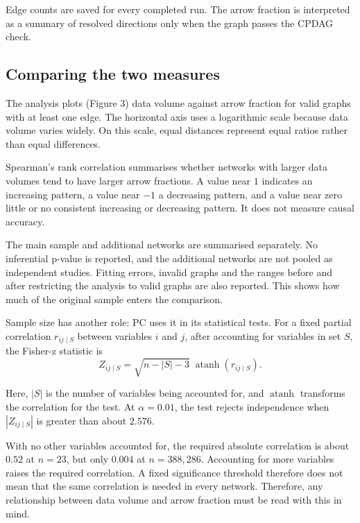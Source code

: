 \documentclass[11pt,a4paper]{article}
\begin{document}
Edge counts are saved for every completed run. The arrow fraction is interpreted as a summary of resolved directions only when the graph passes the CPDAG check.

\subsection{Comparing the two measures}
The analysis plots (Figure 3) data volume against arrow fraction for valid graphs with at least one edge. The horizontal axis uses a logarithmic scale because data volume varies widely. On this scale, equal distances represent equal ratios rather than equal differences.

Spearman's rank correlation summarises whether networks with larger data volumes tend to have larger arrow fractions. A value near $1$ indicates an increasing pattern, a value near $-1$ a decreasing pattern, and a value near zero little or no consistent increasing or decreasing pattern. It does not measure causal accuracy.

The main sample and additional networks are summarised separately. No inferential p-value is reported, and the additional networks are not pooled as independent studies. Fitting errors, invalid graphs and the ranges before and after restricting the analysis to valid graphs are also reported. This shows how much of the original sample enters the comparison.

Sample size has another role: PC uses it in its statistical tests. For a fixed partial correlation $r_{ij\mid S}$ between variables $i$ and $j$, after accounting for variables in set $S$, the Fisher-z statistic is
\begin{equation}
Z_{ij\mid S}=\sqrt{n-|S|-3}\;\operatorname{atanh}(r_{ij\mid S}).
\end{equation}

Here, $|S|$ is the number of variables being accounted for, and $\operatorname{atanh}$ transforms the correlation for the test. At $\alpha=0.01$, the test rejects independence when $|Z_{ij\mid S}|$ is greater than about $2.576$.

With no other variables accounted for, the required absolute correlation is about $0.52$ at $n=23$, but only $0.004$ at $n=388{,}286$. Accounting for more variables raises the required correlation. A fixed significance threshold therefore does not mean that the same correlation is needed in every network. Therefore, any relationship between data volume and arrow fraction must be read with this in mind. 
\end{document}
